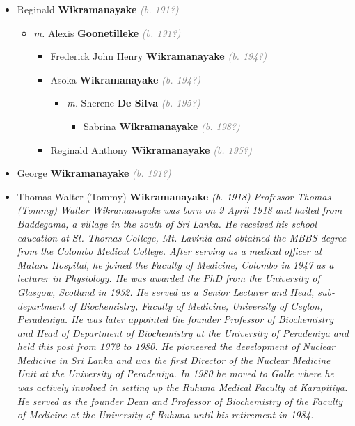 \documentclass[10pt, openany]{book}
\begin{document}
\begin{itemize}
{\begin{itemize}
{\begin{itemize}
{\begin{itemize}
{\begin{itemize}
\end{itemize}
  }
\item{Reginald \textbf{Wikramanayake} \textcolor{gray}{\textit{(b. 191?)}}
\begin{itemize}
\item{\textit{m.} Alexis \textbf{Goonetilleke} \textcolor{gray}{\textit{(b. 191?)}}   \label{couple:00003762:00003880} \begin{itemize}
\item{Frederick John Henry \textbf{Wikramanayake} \textcolor{gray}{\textit{(b. 194?)}}
   }
\item{Asoka \textbf{Wikramanayake} \textcolor{gray}{\textit{(b. 194?)}}
\begin{itemize}
\item{\textit{m.} Sherene \textbf{De Silva} \textcolor{gray}{\textit{(b. 195?)}}   \label{couple:00003882:00003883} \begin{itemize}
\item{Sabrina \textbf{Wikramanayake} \textcolor{gray}{\textit{(b. 198?)}}
 }
\end{itemize}}
\end{itemize}
 }
\item{Reginald Anthony \textbf{Wikramanayake} \textcolor{gray}{\textit{(b. 195?)}}
  }
\end{itemize}}
\end{itemize}
 }
\item{George \textbf{Wikramanayake} \textcolor{gray}{\textit{(b. 191?)}}
 }
\item{Thomas Walter (Tommy) \textbf{Wikramanayake} \textcolor{slorange}{\textit{(b. 1918)}} \textcolor{slmaroon}{\textit{Professor Thomas (Tommy) Walter Wikramanayake was born on 9 April 1918 and hailed from Baddegama, a village in the south of Sri Lanka. He received his school education at St. Thomas College, Mt. Lavinia and obtained the MBBS degree from the Colombo Medical College. After serving as a medical officer at Matara Hospital, he joined the Faculty of Medicine, Colombo in 1947 as a lecturer in Physiology. He was awarded the PhD from the University of Glasgow, Scotland in 1952.
He served as a Senior Lecturer and Head, sub-department of Biochemistry, Faculty of Medicine, University of Ceylon, Peradeniya. He was later appointed the founder Professor of Biochemistry and Head of Department of Biochemistry at the University of Peradeniya and held this post from 1972 to 1980. He pioneered the development of Nuclear Medicine in Sri Lanka and was the first Director of the Nuclear Medicine Unit at the University of Peradeniya. In 1980 he moved to Galle where he was actively involved in setting up the Ruhuna Medical Faculty at Karapitiya. He served as the founder Dean and Professor of Biochemistry of the Faculty of Medicine at the University of Ruhuna until his retirement in 1984.
}}}
\end{itemize}}
\end{itemize}}
\end{itemize}}
\end{itemize}
\end{document}
